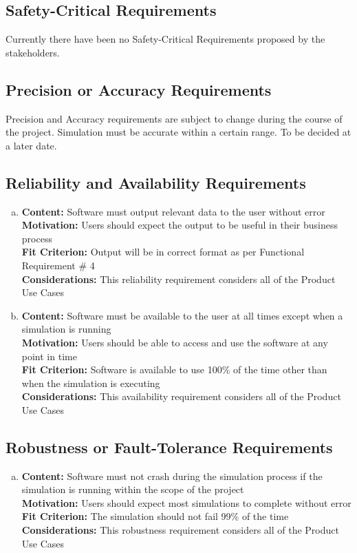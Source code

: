 \documentclass[paper=letter, fontsize=10pt]{scrartcl}
\numberwithin{equation}{section}		%
\numberwithin{figure}{section}			%
\numberwithin{table}{section}				%
\begin{document}
\subsection{Safety-Critical Requirements}
Currently there have been no Safety-Critical Requirements proposed by the stakeholders.
\subsection{Precision or Accuracy Requirements}
Precision and Accuracy requirements are subject to change during the course of the project. Simulation must be accurate within a certain range. To be decided at a later date. 
\subsection{Reliability and Availability Requirements}
	\begin{enumerate}[(a)]
		\item \textbf{Content:} Software must output relevant data to the user without error
		\\	  \textbf{Motivation:} Users should expect the output to be useful in their business process
		\\	  \textbf{Fit Criterion:} Output will be in correct format as per Functional Requirement \# 4
		\\	  \textbf{Considerations:} This reliability requirement considers all of the Product Use Cases 
		\item \textbf{Content:} Software must be available to the user at all times except when a simulation is running
		\\	  \textbf{Motivation:} Users should be able to access and use the software at any point in time
		\\	  \textbf{Fit Criterion:} Software is available to use 100\% of the time other than when the simulation is executing
		\\	  \textbf{Considerations:} This availability requirement considers all of the Product Use Cases 
	\end{enumerate}
\subsection{Robustness or Fault-Tolerance Requirements}
	\begin{enumerate}[(a)]
		\item \textbf{Content:} Software must not crash during the simulation process if the simulation is running within the scope of the project
		\\	  \textbf{Motivation:} Users should expect most simulations to complete without error
		\\	  \textbf{Fit Criterion:} The simulation should not fail 99\% of the time
		\\	  \textbf{Considerations:} This robustness requirement considers all of the Product Use Cases
	\end{enumerate}
\end{document}

